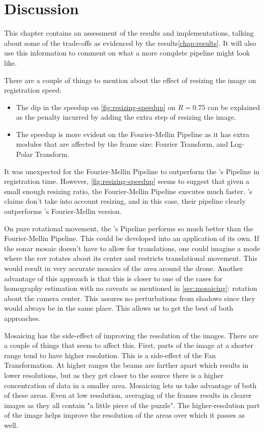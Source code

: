 \chapter{Discussion}
\label{chap:discussion}

This chapter contains an assessment of the results and implementations, talking about some of the trade-offs as evidenced by the results\ref{chap:results}. It will also use this information to comment on what a more complete pipeline might look like. 

There are a couple of things to mention about the effect of resizing the image on registration speed:
\begin{itemize}
    \item The dip in the speedup on \autoref{fig:resizing-speedup} on \(R=0.75\) can be explained as the penalty incurred by adding the extra step of resizing the image.
    \item The speedup is more evident on the Fourier-Mellin Pipeline as it has extra modules that are affected by the frame size: Fourier Transform, and Log-Polar Transform. 
\end{itemize}

It was unexpected for the Fourier-Mellin Pipeline to outperform the \citeauthor{Hurtos2015}'s Pipeline in registration time. However, \autoref{fig:resizing-speedup} seems to suggest that given a small enough resizing ratio, the Fourier-Mellin Pipeline executes much faster. \citeauthor{Hurtos2015}'s claims don't take into account resizing, and in this case, their pipeline clearly outperforms \citeauthor{Reddy1996}'s Fourier-Mellin version.

On pure rotational movement, the \citeauthor{Hurtos2015}'s Pipeline performs so much better than the Fourier-Mellin Pipeline. This could be developed into an application of its own. If the sonar mosaic doesn't have to allow for translations, one could imagine a mode where the \acrshort{rov} rotates about its center and restricts translational movement. This would result in very accurate mosaics of the area around the drone. Another advantage of this approach is that this is closer to one of the cases for homography estimation with no caveats as mentioned in \autoref{sec:mosaicing}: rotation about the camera center. This assures no perturbations from shadows since they would always be in the same place. This allows us to get the best of both approaches.

Mosaicing has the side-effect of improving the resolution of the images. There are a couple of things that seem to affect this. First, parts of the image at a shorter range tend to have higher resolution. This is a side-effect of the Fan Transformation. At higher ranges the beams are farther apart which results in lower resolutions, but as they get closer to the source there is a higher concentration of data in a smaller area. Mosaicing lets us take advantage of both of these areas. Even at low resolution, averaging of the frames results in clearer images as they all contain "a little piece of the puzzle". The higher-resolution part of the image helps improve the resolution of the areas over which it passes as well. 


